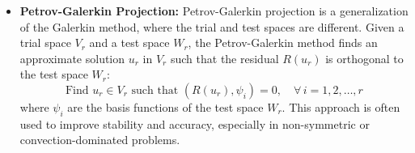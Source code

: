 \documentclass[11pt]{article}
\begin{document}
\begin{itemize}
                    \item \textbf{Petrov-Galerkin Projection:} Petrov-Galerkin projection is a generalization of the Galerkin method, where the trial and test spaces are different. Given a trial space \( V_r \) and a test space \( W_r \), the Petrov-Galerkin method finds an approximate solution \( u_r \) in \( V_r \) such that the residual \( R(u_r) \) is orthogonal to the test space \( W_r \):
                    \[
                    \text{Find } u_r \in V_r \text{ such that } \left( R(u_r), \psi_i \right) = 0, \quad \forall \, i = 1, 2, \ldots, r
                    \]
                    where \( \psi_i \) are the basis functions of the test space \( W_r \). This approach is often used to improve stability and accuracy, especially in non-symmetric or convection-dominated problems.


\end{itemize}
\end{document}
